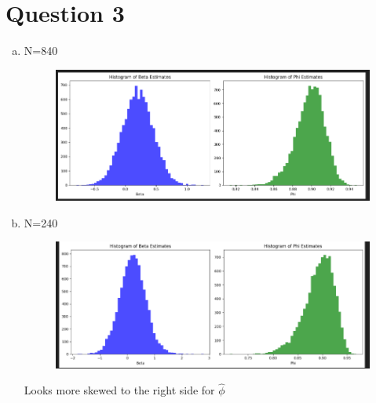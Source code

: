 
\section*{Question 3}

\begin{enumerate}[(a)]
    \item
    N=840\\
    \begin{figure}[h]
        \centering
        \includegraphics[width=0.9\linewidth]{Out/840plot.png}
        
    \end{figure}

  \item
    N=240\\
    \begin{figure}[h]
        \centering
        \includegraphics[width=0.9\linewidth]{Out/240.png}
        
    \end{figure}
Looks more skewed to the right side for $\hat{\phi}$
\end{enumerate}
